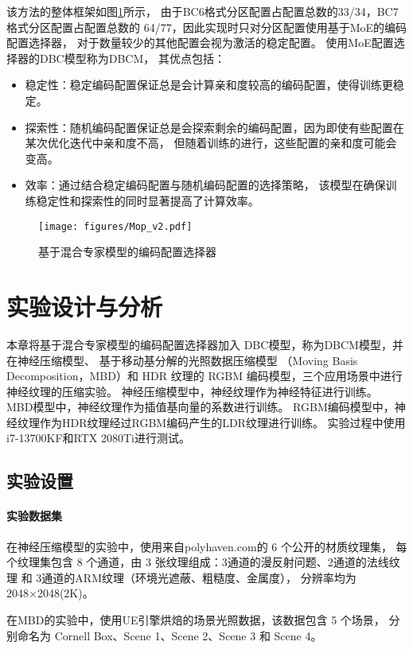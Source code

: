 该方法的整体框架如图\ref{fig:Mop}所示，
由于BC6格式分区配置占配置总数的33/34，BC7格式分区配置占配置总数的
64/77，因此实现时只对分区配置使用基于MoE的编码配置选择器，
对于数量较少的其他配置会视为激活的稳定配置。
使用MoE配置选择器的DBC模型称为DBCM，
其优点包括：
\begin{itemize}
\item 稳定性：稳定编码配置保证总是会计算亲和度较高的编码配置，使得训练更稳定。
\item 探索性：随机编码配置保证总是会探索剩余的编码配置，因为即使有些配置在某次优化迭代中亲和度不高，
但随着训练的进行，这些配置的亲和度可能会变高。
\item 效率：通过结合稳定编码配置与随机编码配置的选择策略，
该模型在确保训练稳定性和探索性的同时显著提高了计算效率。
\end{itemize}
\begin{figure}[htbp]
    \centering
    \texttt{[image: figures/Mop\_v2.pdf]}
    \caption{基于混合专家模型的编码配置选择器}
    \label{fig:Mop}
\end{figure}


\section{实验设计与分析}

本章将基于混合专家模型的编码配置选择器加入
DBC模型，称为DBCM模型，并在神经压缩模型、
基于移动基分解的光照数据压缩模型
\cite{silvennoinen2021moving}（Moving Basis Decomposition，MBD）和
HDR 纹理的 RGBM 编码模型，三个应用场景中进行神经纹理的压缩实验。
神经压缩模型中，神经纹理作为神经特征进行训练。
MBD模型中，神经纹理作为插值基向量的系数进行训练。
RGBM编码模型中，神经纹理作为HDR纹理经过RGBM编码产生的LDR纹理进行训练。
实验过程中使用i7-13700KF和RTX 2080Ti进行测试。

\subsection{实验设置}

\paragraph{实验数据集}

在神经压缩模型的实验中，使用来自polyhaven.com\cite{PolyHaven}的 6 个公开的材质纹理集，
每个纹理集包含 8 个通道，由 3 张纹理组成：3通道的漫反射问题、2通道的法线纹理 和 3通道的ARM纹理（环境光遮蔽、粗糙度、金属度），
分辨率均为2048×2048(2K)。

在MBD的实验中，使用UE引擎烘焙的场景光照数据，该数据包含 5 个场景，
分别命名为 Cornell Box、Scene 1、Scene 2、Scene 3 和 Scene 4。

